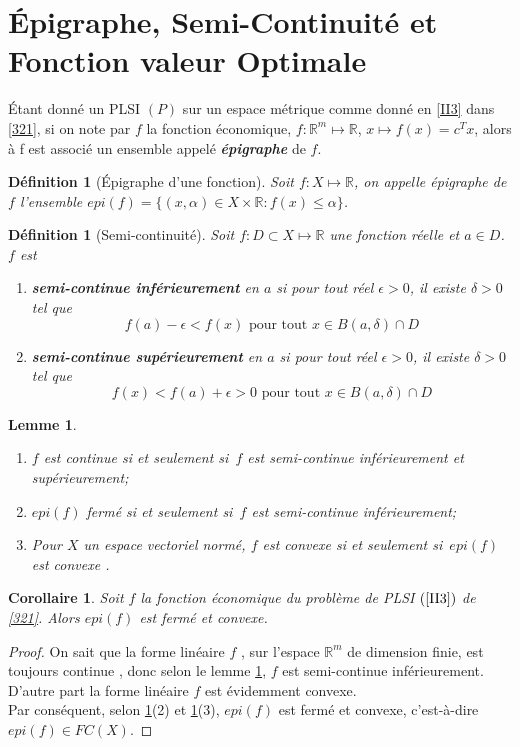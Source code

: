 \documentclass[11pt]{report}
\newenvironment{boxtheorem}
{\begin{tcolorbox}
		[enhanced jigsaw,breakable,pad at break*=2mm,
		colback=black!5,colframe=bleueLeger]}
	{\end{tcolorbox}}
\newenvironment{boxdefinition}
{\begin{tcolorbox}
		[enhanced jigsaw,breakable,pad at break*=1mm,
		colback=black!5!white,boxrule=0pt,frame hidden,
		borderline west={1.5mm}{-2mm}{blue}]}
	{\end{tcolorbox}}
\newenvironment{boxcorollaire}
{\begin{tcolorbox}
		[enhanced jigsaw,breakable,pad at break*=1mm,
		colback=black!5!white,boxrule=0pt,frame hidden,
		borderline east={1.5mm}{-2mm}{blue}]}
	{\end{tcolorbox}}
\theoremstyle{styletheorem}
\newtheorem{corollary}[theoreme]{Corollaire}
\newtheorem{lemma}[theoreme]{Lemme}
\theoremstyle{styledef}
\newtheorem{definitions}[theoreme]{Définition}
\theoremstyle{remark}
\newenvironment{lemme}
{\vspace*{0.3cm}\begin{boxtheorem}\begin{lemma}}{\end{lemma}\end{boxtheorem}\vspace*{0.3cm}}
\newenvironment{corollaire}{\begin{boxcorollaire}\begin{corollary}}{\end{corollary}\end{boxcorollaire}}
\newenvironment{definition}{\vspace*{0.3cm}\begin{boxdefinition}\begin{definitions}}{\end{definitions}\end{boxdefinition}\vspace*{0.3cm}}
\newcommand{\ie}{c'est-à-dire }
\newcommand{\ssi}{si et seulement si\  }
\newcommand{\R}{\ensuremath{\mathbb{R}}}
\begin{document}
	\section{Épigraphe, Semi-Continuité et Fonction valeur Optimale}
	Étant donné un PLSI $(P)$ sur un espace métrique comme donné en \ref{II3} dans \ref{321}, si on note par $f$ la fonction économique, $f\colon \R^m \mapsto \R$, $x\longmapsto f(x) = c^Tx$, alors à f est associé un ensemble appelé \textbf{\emph{épigraphe}} de $f$.
	\begin{definition}[Épigraphe d'une fonction]
		Soit $f \colon X \mapsto \R$, on appelle épigraphe de $f$ l'ensemble $epi (f) = \lbrace (x,\alpha) \in X\times \R\colon f(x)\leq \alpha\rbrace$.
	\end{definition}
	\begin{definition}[Semi-continuité\cite{b8}]
		Soit $f \colon D \subset X \mapsto \R$ une fonction réelle et $ a \in D$. $f$ est \begin{enumerate}[label = $\bullet$]
			\item \textbf{semi-continue inférieurement} en $a$ si  pour tout réel $\epsilon>0$, il existe $\delta >0$ tel que $$f(a)-\epsilon < f(x) \text{ pour tout } x \in B(a,\delta) \cap D$$
			
			\item \textbf{semi-continue supérieurement} en $a$ si pour tout réel $\epsilon>0$, il existe $\delta >0$ tel que $$f(x) < f(a) +\epsilon>0 \text{ pour tout } x \in B(a,\delta) \cap D$$
		\end{enumerate}
	\end{definition}
	\begin{lemme}\label{313}
		\begin{enumerate} Soit $f$ une fonction sur un ensemble $X$
			\item $f$ est continue \ssi $f$ est semi-continue inférieurement et supérieurement;
			\item $epi (f)$ fermé \ssi $f$ est semi-continue inférieurement;
			\item Pour $X$ un espace vectoriel normé, $f$ est convexe \ssi $epi(f)$ est convexe \cite{b21, b22}.
		\end{enumerate}
	\end{lemme}
	\begin{corollaire}
		Soit $f$ la fonction économique du problème de PLSI  $(\ref{II3})$ de \ref{321}. Alors $epi(f)$ est fermé et convexe.
	\end{corollaire}
	\begin{proof}
		On sait que la forme linéaire $f$ , sur l'espace $\R^m$ de dimension finie, est toujours continue \cite{b11}, donc selon le lemme  \ref{313}, $f$ est semi-continue inférieurement.\\ D'autre part la forme linéaire $f$ est évidemment convexe.\\
		Par conséquent, selon \ref{313}(2) et \ref{313}(3), $epi(f)$ est fermé et convexe, \ie $epi(f) \in FC(X)$.
		
		
	\end{proof}
\end{document}
